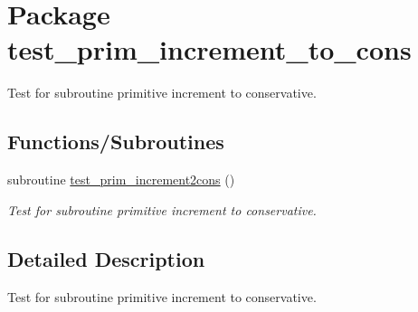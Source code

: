 \hypertarget{a00093}{
\section{Package test\_\-prim\_\-increment\_\-to\_\-cons}
\label{a00093}
}
Test for subroutine primitive increment to conservative.  


\subsection*{Functions/Subroutines}
\begin{CompactItemize}
\item 
\hypertarget{a00093_3a587d0e4c7515c53114c02574961eb4}{
subroutine \hyperlink{a00093_3a587d0e4c7515c53114c02574961eb4}{test\_\-prim\_\-increment2cons} ()}
\label{a00093_3a587d0e4c7515c53114c02574961eb4}

\begin{CompactList}\small\item\em Test for subroutine primitive increment to conservative. \item\end{CompactList}\end{CompactItemize}


\subsection{Detailed Description}
Test for subroutine primitive increment to conservative. 

